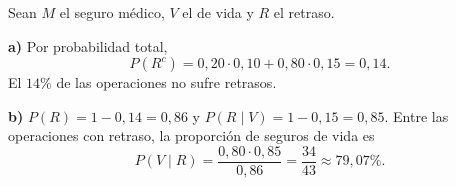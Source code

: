 Sean $M$ el seguro médico, $V$ el de vida y $R$ el retraso.

\textbf{a)} Por probabilidad total,
\[
P(R^c)=0{,}20\cdot0{,}10+0{,}80\cdot0{,}15=\boxed{0{,}14}.
\]
El $14\%$ de las operaciones no sufre retrasos.

\textbf{b)} $P(R)=1-0{,}14=0{,}86$ y $P(R\mid V)=1-0{,}15=0{,}85$. Entre las operaciones con retraso, la proporción de seguros de vida es
\[
P(V\mid R)=\frac{0{,}80\cdot0{,}85}{0{,}86}=\frac{34}{43}\approx\boxed{79{,}07\%}.
\]
